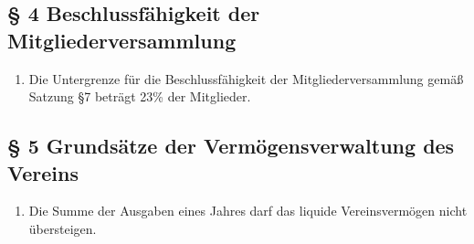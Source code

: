 \documentclass[10pt,a4paper]{article}
\begin{document}
\subsection*{§ 4 Beschlussfähigkeit der Mitgliederversammlung}
\begin{enumerate}
\item Die Untergrenze für die Beschlussfähigkeit der Mitgliederversammlung
	gemäß Satzung §7 beträgt 23\% der Mitglieder.
\end{enumerate}

\subsection*{§ 5 Grundsätze der Vermögensverwaltung des Vereins}
\begin{enumerate}
\item Die Summe der Ausgaben eines Jahres darf das liquide Vereinsvermögen
	nicht übersteigen.
\end{enumerate}
\end{document}
